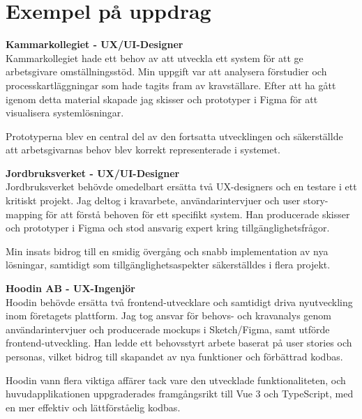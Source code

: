 \documentclass[a4paper,10pt]{article}
\begin{document}
\vspace{0.5cm}

\section*{Exempel på uppdrag}

\textbf{Kammarkollegiet - UX/UI-Designer}\\
Kammarkollegiet hade ett behov av att utveckla ett system för att ge arbetsgivare omställningsstöd. Min uppgift var att analysera förstudier och processkartläggningar som hade tagits fram av kravställare. Efter att ha gått igenom detta material skapade jag skisser och prototyper i Figma för att visualisera systemlösningar. 

Prototyperna blev en central del av den fortsatta utvecklingen och säkerställde att arbetsgivarnas behov blev korrekt representerade i systemet.

\vspace{0.3cm}

\textbf{Jordbruksverket - UX/UI-Designer}\\
Jordbruksverket behövde omedelbart ersätta två UX-designers och en testare i ett kritiskt projekt. Jag deltog i kravarbete, användarintervjuer och user story-mapping för att förstå behoven för ett specifikt system. Han producerade skisser och prototyper i Figma och stod ansvarig expert kring tillgänglighetsfrågor.

Min insats bidrog till en smidig övergång och snabb implementation av nya lösningar, samtidigt som tillgänglighetsaspekter säkerställdes i flera projekt.

\vspace{0.3cm}

\textbf{Hoodin AB - UX-Ingenjör}\\
Hoodin behövde ersätta två frontend-utvecklare och samtidigt driva nyutveckling inom företagets plattform. Jag tog ansvar för behovs- och kravanalys genom användarintervjuer och producerade mockups i Sketch/Figma, samt utförde frontend-utveckling. Han ledde ett behovsstyrt arbete baserat på user stories och personas, vilket bidrog till skapandet av nya funktioner och förbättrad kodbas.

\vspace{0.3cm}

Hoodin vann flera viktiga affärer tack vare den utvecklade funktionaliteten, och huvudapplikationen uppgraderades framgångsrikt till Vue 3 och TypeScript, med en mer effektiv och lättförståelig kodbas.
\end{document}
